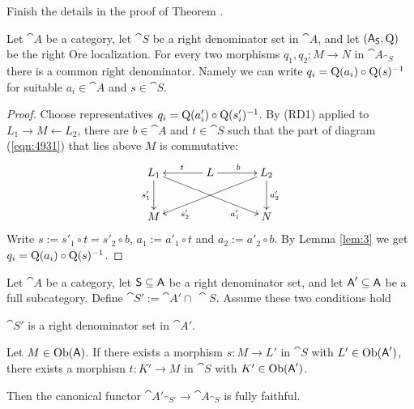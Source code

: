 \begin{exer} \label{exer:3030}
Finish the details in the proof of Theorem \tup{\ref{thm:103}}. 
\end{exer}

\begin{prop} \label{prop:107}
Let $\cat{A}$ be a category, let $\cat{S}$ be a right
denominator set in $\cat{A}$, and let $(\operatorname{\mathsf{A}}_{\operatorname{\mathsf{S}}}, \operatorname{Q})$ be the 
right Ore
localization.
For every two morphisms $q_1, q_2 : M \to N$ in $\cat{A}_{\cat{S}}$ there
is a common right denominator. Namely we can write 
$q_i = \operatorname{Q}(a_i) \circ \operatorname{Q}(s)^{-1}$
for suitable $a_i \in \cat{A}$ and $s \in \cat{S}$. 
\end{prop}

\begin{proof}
Choose representatives
$q_i = \operatorname{Q}(a'_i) \circ \operatorname{Q}(s'_i)^{-1}$. 
By (RD1) applied to $L_1 \to M \leftarrow L_2$, 
there are $b \in \cat{A}$ and $t \in \cat{S}$ 
such that the part of diagram (\ref{eqn:4931}) that lies above $M$ is 
commutative:
\begin{equation} \label{eqn:4931}
\UseTips  \xymatrix @C=8ex @R=6ex  {
L_1
\ar[d]_{s'_1}
\ar[drr]_(0.75){a'_1}
& 
L
\ar[l]_{t}
\ar[r]^{b}
&
L_2
\ar[dll]^(0.75){s'_2}
\ar[d]^{a'_2}
\\
M 
& 
&
N
} 
\end{equation}
Write
$s := s'_1 \circ t = s'_2 \circ b$,  $a_1 := a'_1 \circ t$ and 
$a_2 := a'_2 \circ b$. 
By Lemma \ref{lem:3} we get 
$q_i = \operatorname{Q}(a_i) \circ \operatorname{Q}(s)^{-1}$.
\end{proof}

\begin{prop} \label{prop:3380} 
Let $\cat{A}$ be a category, let $\operatorname{\mathsf{S}} \subseteq \operatorname{\mathsf{A}}$ be a right denominator 
set, and let $\operatorname{\mathsf{A}}' \subseteq \operatorname{\mathsf{A}}$ be a full subcategory.  
Define $\cat{S}' := \cat{A}' \cap \, \cat{S}$. 
Assume these two conditions hold\tup{:}
\begin{itemize}
 $\cat{S}'$ is a right denominator set in $\cat{A}'$.

 Let $M \in \operatorname{Ob}(\operatorname{\mathsf{A}})$. If 
there exists a morphism $s : M \to L'$ in $\cat{S}$ with 
$L' \in \operatorname{Ob}(\operatorname{\mathsf{A}}')$, 
there exists a morphism $t : K' \to M$ in $\cat{S}$ with 
$K' \in \operatorname{Ob}(\operatorname{\mathsf{A}}')$.
\end{itemize}
Then the canonical functor 
$\cat{A}'_{\cat{S}'} \to \cat{A}_{\cat{S}}$ 
is fully faithful.
\end{prop}

